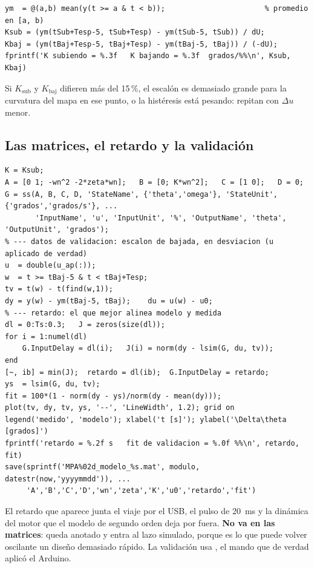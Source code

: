 \documentclass[11pt,letterpaper]{article}
\newcommand{\sen}[1]{\texttt{\detokenize{#1}}}             %
\begin{document}
\begin{lstlisting}[caption={Ganancia estática con el escalón de subida (\texttt{analisis\_escalones\_modelo.m}, parte 1).}]
ym  = @(a,b) mean(y(t >= a & t < b));                       % promedio en [a, b)
Ksub = (ym(tSub+Tesp-5, tSub+Tesp) - ym(tSub-5, tSub)) / dU;
Kbaj = (ym(tBaj+Tesp-5, tBaj+Tesp) - ym(tBaj-5, tBaj)) / (-dU);
fprintf('K subiendo = %.3f   K bajando = %.3f  grados/%%\n', Ksub, Kbaj)
\end{lstlisting}

Si $K_\text{sub}$ y $K_\text{baj}$ difieren más del 15\,\%, el escalón es demasiado grande para la curvatura del mapa en ese punto, o la histéresis está pesando: repitan con $\Delta u$ menor.

\subsection{Las matrices, el retardo y la validación}

\begin{lstlisting}[caption={Modelo en espacio de estados y validación con el escalón de bajada (parte 2).}]
K = Ksub;
A = [0 1; -wn^2 -2*zeta*wn];   B = [0; K*wn^2];   C = [1 0];   D = 0;
G = ss(A, B, C, D, 'StateName', {'theta','omega'}, 'StateUnit', {'grados','grados/s'}, ...
       'InputName', 'u', 'InputUnit', '%', 'OutputName', 'theta', 'OutputUnit', 'grados');
% --- datos de validacion: escalon de bajada, en desviacion (u aplicado de verdad)
u  = double(u_ap(:));
w  = t >= tBaj-5 & t < tBaj+Tesp;
tv = t(w) - t(find(w,1));
dy = y(w) - ym(tBaj-5, tBaj);    du = u(w) - u0;
% --- retardo: el que mejor alinea modelo y medida
dl = 0:Ts:0.3;   J = zeros(size(dl));
for i = 1:numel(dl)
    G.InputDelay = dl(i);   J(i) = norm(dy - lsim(G, du, tv));
end
[~, ib] = min(J);  retardo = dl(ib);  G.InputDelay = retardo;
ys  = lsim(G, du, tv);
fit = 100*(1 - norm(dy - ys)/norm(dy - mean(dy)));
plot(tv, dy, tv, ys, '--', 'LineWidth', 1.2); grid on
legend('medido', 'modelo'); xlabel('t [s]'); ylabel('\Delta\theta [grados]')
fprintf('retardo = %.2f s   fit de validacion = %.0f %%\n', retardo, fit)
save(sprintf('MPA%02d_modelo_%s.mat', modulo, datestr(now,'yyyymmdd')), ...
     'A','B','C','D','wn','zeta','K','u0','retardo','fit')
\end{lstlisting}

El retardo que aparece junta el viaje por el USB, el pulso de \SI{20}{ms} y la dinámica del motor que el modelo de segundo orden deja por fuera. \textbf{No va en las matrices}: queda anotado y entra al lazo simulado, porque es lo que puede volver oscilante un diseño demasiado rápido. La validación usa \sen{u_ap}, el mando que de verdad aplicó el Arduino.
\end{document}
